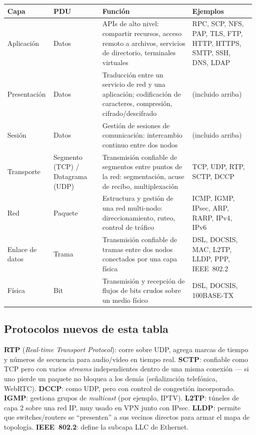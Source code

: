 \documentclass[11pt,a4paper]{article}
\begin{document}
\begin{center}
\small
\begin{tabularx}{\textwidth}{@{}l l X X@{}}
\toprule
\textbf{Capa} & \textbf{PDU} & \textbf{Función} & \textbf{Ejemplos} \\
\midrule
Aplicación & Datos & APIs de alto nivel: compartir recursos, acceso remoto a archivos, servicios de directorio, terminales virtuales & RPC, SCP, NFS, PAP, TLS, FTP, HTTP, HTTPS, SMTP, SSH, DNS, LDAP \\
Presentación & Datos & Traducción entre un servicio de red y una aplicación; codificación de caracteres, compresión, cifrado/descifrado & (incluido arriba) \\
Sesión & Datos & Gestión de sesiones de comunicación: intercambio continuo entre dos nodos & (incluido arriba) \\
Transporte & Segmento (TCP) / Datagrama (UDP) & Transmisión confiable de segmentos entre puntos de la red: segmentación, acuse de recibo, multiplexación & TCP, UDP, RTP, SCTP, DCCP \\
Red & Paquete & Estructura y gestión de una red multi-nodo: direccionamiento, ruteo, control de tráfico & ICMP, IGMP, IPsec, ARP, RARP, IPv4, IPv6 \\
Enlace de datos & Trama & Transmisión confiable de tramas entre dos nodos conectados por una capa física & DSL, DOCSIS, MAC, L2TP, LLDP, PPP, IEEE~802.2 \\
Física & Bit & Transmisión y recepción de flujos de bits crudos sobre un medio físico & DSL, DOCSIS, 100BASE-TX \\
\bottomrule
\end{tabularx}
\end{center}

\subsection*{Protocolos nuevos de esta tabla}
\textbf{RTP} (\textit{Real-time Transport Protocol}): corre sobre UDP, agrega marcas de tiempo y números de secuencia para audio/video en tiempo real. \textbf{SCTP}: confiable como TCP pero con varios \textit{streams} independientes dentro de una misma conexión --- si uno pierde un paquete no bloquea a los demás (señalización telefónica, WebRTC). \textbf{DCCP}: como UDP, pero con control de congestión incorporado. \textbf{IGMP}: gestiona grupos de \textit{multicast} (por ejemplo, IPTV). \textbf{L2TP}: túneles de capa 2 sobre una red IP, muy usado en VPN junto con IPsec. \textbf{LLDP}: permite que switches/routers se ``presenten'' a sus vecinos directos para armar el mapa de topología. \textbf{IEEE~802.2}: define la subcapa LLC de Ethernet.
\end{document}

